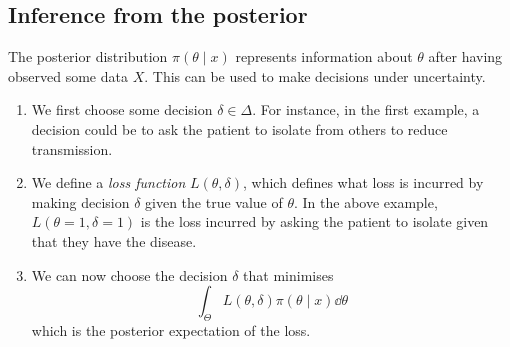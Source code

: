 \subsection{Inference from the posterior}
The posterior distribution \( \pi(\theta \mid x) \) represents information about \( \theta \) after having observed some data \( X \).
This can be used to make decisions under uncertainty.
\begin{enumerate}
	\item We first choose some decision \( \delta \in \Delta \).
	      For instance, in the first example, a decision could be to ask the patient to isolate from others to reduce transmission.
	\item We define a \textit{loss function} \( L(\theta,\delta) \), which defines what loss is incurred by making decision \( \delta \) given the true value of \( \theta \).
	      In the above example, \( L(\theta = 1, \delta = 1) \) is the loss incurred by asking the patient to isolate given that they have the disease.
	\item We can now choose the decision \( \delta \) that minimises
	      \[
		      \int_\Theta L(\theta, \delta) \pi(\theta \mid x) \dd{\theta}
	      \]
	      which is the posterior expectation of the loss.
\end{enumerate}

